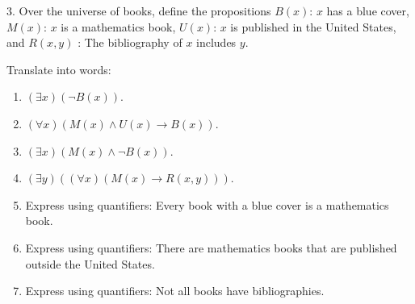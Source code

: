 \documentclass[10pt,]{book}
\theoremstyle{plain}
\theoremstyle{definition}
\theoremstyle{definition}
\theoremstyle{definition}
\theoremstyle{definition}
\begin{document}
\begin{exercisegroup}
%
\par\smallskip
\item[3.]\hypertarget{exercise-54}{}Over the universe of books, define the propositions \(B(x)\): \(x\) has a blue cover, \(M(x)\): \(x\) is a mathematics book, \(U(x)\):
\(x\) is published in the United States, and \(R(x, y)\) : The bibliography of \(x\) includes \(y\).%
\par
Translate into words:%
\par
\leavevmode%
\begin{enumerate}[label=\alph*]
\item\hypertarget{li-300}{} \((\exists x)(\neg B(x))\).%
\item\hypertarget{li-301}{}\((\forall x)(M(x) \land  U(x) \rightarrow  B(x))\).%
\item\hypertarget{li-302}{} \((\exists x)(M(x) \land  \neg B(x))\).%
\item\hypertarget{li-303}{}\((\exists y)((\forall x)(M(x)\to R(x,y)))\).%
\item\hypertarget{li-304}{}Express using quantifiers: Every book with a blue cover is a mathematics book.%
\item\hypertarget{li-305}{}Express using quantifiers: There are mathematics books that are published outside the United States.%
\item\hypertarget{li-306}{}Express using quantifiers: Not all books have bibliographies.%
\end{enumerate}


\end{exercisegroup}
\end{document}
